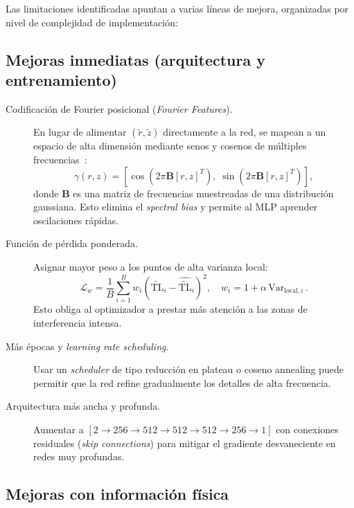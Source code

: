 \documentclass[12pt,a4paper]{article}
\newcommand{\TL}{\mathrm{TL}}
\newcommand{\rnorm}{\tilde{r}}
\newcommand{\znorm}{\tilde{z}}
\newcommand{\TLnorm}{\widetilde{\TL}}
\begin{document}
Las limitaciones identificadas apuntan a varias líneas de mejora, organizadas
por nivel de complejidad de implementación:

\subsection{Mejoras inmediatas (arquitectura y entrenamiento)}

\begin{description}
  \item[Codificación de Fourier posicional (\emph{Fourier Features}).~]
    En lugar de alimentar $(\rnorm, \znorm)$ directamente a la red, se mapean
    a un espacio de alta dimensión mediante senos y cosenos de múltiples
    frecuencias~\cite{tancik2020}:
    \begin{equation}
      \gamma(r,z) = \left[\cos(2\pi\mathbf{B}[r,z]^T),\;
                          \sin(2\pi\mathbf{B}[r,z]^T)\right],
    \end{equation}
    donde $\mathbf{B}$ es una matriz de frecuencias muestreadas de una
    distribución gaussiana. Esto elimina el \emph{spectral bias} y permite
    al MLP aprender oscilaciones rápidas.

  \item[Función de pérdida ponderada.~]
    Asignar mayor peso a los puntos de alta varianza local:
    \begin{equation}
      \mathcal{L}_w = \frac{1}{B}\sum_{i=1}^{B}
                      w_i\left(\TLnorm_i - \hat{\TLnorm}_i\right)^2,
      \quad w_i = 1 + \alpha\,\mathrm{Var}_{\text{local},i}\,.
    \end{equation}
    Esto obliga al optimizador a prestar más atención a las zonas de
    interferencia intensa.

  \item[Más épocas y \emph{learning rate scheduling}.~]
    Usar un \emph{scheduler} de tipo reducción en plateau o coseno annealing
    puede permitir que la red refine gradualmente los detalles de alta
    frecuencia.

  \item[Arquitectura más ancha y profunda.~]
    Aumentar a $[2 \to 256 \to 512 \to 512 \to 512 \to 256 \to 1]$ con
    conexiones residuales (\emph{skip connections}) para mitigar el gradiente
    desvaneciente en redes muy profundas.
\end{description}

\subsection{Mejoras con información física}
\end{document}
